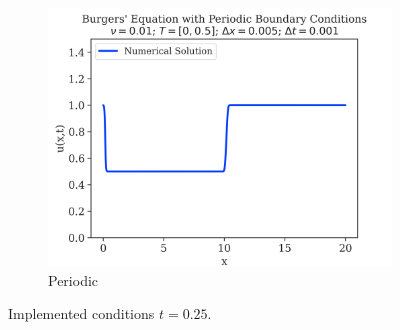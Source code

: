 \begin{figure}
\begin{subfigure}{0.55\linewidth}
		\includegraphics[width=\linewidth]{../periodic_BC/images_nu=0.01/250_plot}
		\caption{Periodic}
	\end{subfigure}

	\caption{Implemented conditions $t=0.25$.}
	\label{fig:0.25-figures}
\end{figure}

